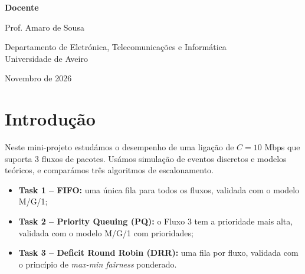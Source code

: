 \documentclass[11pt,a4paper]{article}
\begin{document}
\begin{titlepage}
  \vspace{0.8cm}
  {\large\textbf{Docente}\par}
  \vspace{0.3cm}
  {\large Prof. Amaro de Sousa\par}

  \vfill
  {\large Departamento de Eletrónica, Telecomunicações e Informática\\
   Universidade de Aveiro\par}
  \vspace{0.6cm}
  {\large Novembro de 2026\par}
  \vspace*{0.3cm}
\end{titlepage}

\tableofcontents
\newpage

\section{Introdução}

Neste mini-projeto estudámos o desempenho de uma ligação de $C = 10$ Mbps que suporta 3 fluxos de pacotes. Usámos simulação de eventos discretos e modelos teóricos, e comparámos três algoritmos de escalonamento.

\begin{itemize}
  \item \textbf{Task 1 -- FIFO:} uma única fila para todos os fluxos, validada com o modelo M/G/1;
  \item \textbf{Task 2 -- Priority Queuing (PQ):} o Fluxo 3 tem a prioridade mais alta, validada com o modelo M/G/1 com prioridades;
  \item \textbf{Task 3 -- Deficit Round Robin (DRR):} uma fila por fluxo, validada com o princípio de \textit{max-min fairness} ponderado.
\end{itemize}




\end{document}
